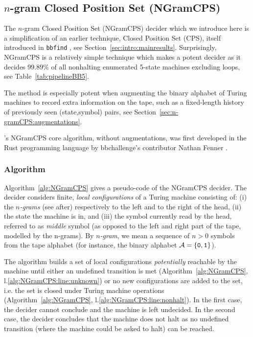 
\newcommand{\ngramcps}{NGramCPS\xspace}

\subsection{$n$-gram Closed Position Set (\ngramcps)}\label{sec:n-gramCPS}

The $n$-gram Closed Position Set (\ngramcps) decider which we introduce here is a simplification of an earlier technique, Closed Position Set (CPS), itself introduced in \texttt{bbfind} \cite{Skelet_bbfind}, see Section~\ref{sec:intro:mainresults}. Surprisingly, \ngramcps is a relatively simple technique which makes a potent decider as it decides 99.89\% of all nonhalting enumerated 5-state machines excluding loops, see Table~\ref{tab:pipelineBB5}.

The method is especially potent when augmenting the binary alphabet of Turing machines to record extra information on the tape, such as a fixed-length history of previously seen (state,symbol) pairs, see Section~\ref{sec:n-gramCPS:augmentations}.

\CoqBBnospace's \ngramcps core algorithm, without augmentations, was first developed in the Rust programming language by bbchallenge's contributor Nathan Fenner \cite{ngramcps_fenner}. 

\subsubsection{Algorithm}\label{sec:n-gramCPS:algo}

Algorithm~\ref{alg:NGramCPS} gives a pseudo-code of the \ngramcps decider. The decider considers finite, \textit{local configurations} of a Turing machine consisting of: (i) the \textit{$n$-grams} (see after) respectively to the left and to the right of the head, (ii) the state the machine is in, and (iii) the symbol currently read by the head, referred to as \textit{middle} symbol (as opposed to the left and right part of the tape, modelled by the n-grams). By \textit{$n$-gram}, we mean a sequence of $n > 0$ symbols from the tape alphabet (for instance, the binary alphabet $\mathcal{A}=\{\texttt{0},\texttt{1}\}$).

The algorithm builds a set of local configurations \textit{potentially} reachable by the machine until either an undefined transition is met (Algorithm~\ref{alg:NGramCPS}, l.\ref{alg:NGramCPS:line:unknown}) or no new configurations are added to the set, i.e. the set is closed under Turing machine operations (Algorithm~\ref{alg:NGramCPS}, l.\ref{alg:NGramCPS:line:nonhalt}). In the first case, the decider cannot conclude and the machine is left undecided. In the second case, the decider concludes that the machine does not halt as no undefined transition (\ie where the machine could be asked to halt) can be reached.

